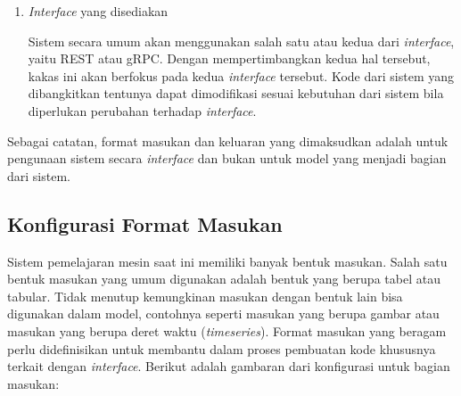 \begin{enumerate}
	\item \textit{Interface} yang disediakan

	Sistem secara umum akan menggunakan salah satu atau kedua dari \textit{interface}, yaitu REST atau gRPC.
	Dengan mempertimbangkan kedua hal tersebut, kakas ini akan berfokus pada kedua \textit{interface} tersebut.
	Kode dari sistem yang dibangkitkan tentunya dapat dimodifikasi sesuai kebutuhan dari sistem bila diperlukan perubahan terhadap \textit{interface}.

\end{enumerate}

Sebagai catatan, format masukan dan keluaran yang dimaksudkan adalah untuk pengunaan sistem secara \textit{interface} dan bukan untuk model yang menjadi bagian dari sistem.

\subsection{Konfigurasi Format Masukan}

Sistem pemelajaran mesin saat ini memiliki banyak bentuk masukan.
Salah satu bentuk masukan yang umum digunakan adalah bentuk yang berupa tabel atau tabular.
Tidak menutup kemungkinan masukan dengan bentuk lain bisa digunakan dalam model, contohnya seperti masukan yang berupa gambar atau masukan yang berupa deret waktu (\textit{timeseries}).
Format masukan yang beragam perlu didefinisikan untuk membantu dalam proses pembuatan kode khususnya terkait dengan \textit{interface}.
Berikut adalah gambaran dari konfigurasi untuk bagian masukan:
